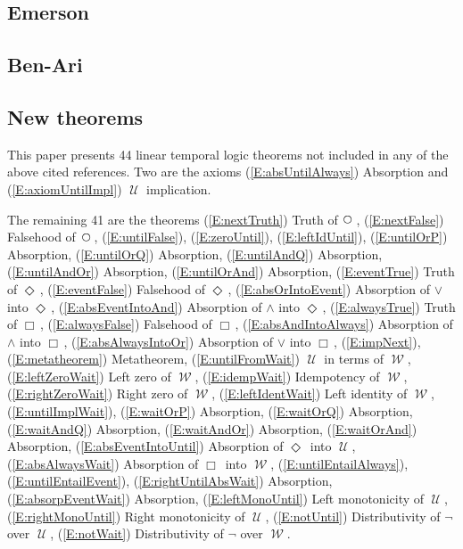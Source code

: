 \documentclass[12pt, fleqn, leqno]{article}
\newcommand{\Until}{\;\mathcal{U}\;}
\newcommand{\Wait}{\;\mathcal{W}\;}
\newcommand{\Next}{\;\,\text{\raisebox{3.5pt}{\circle{6}}}}
\newcommand{\Event}{\Diamond\,}
\newcommand{\Always}{\Box\,}
\begin{document}
\subsection{Emerson}

\subsection{Ben-Ari}

\subsection{New theorems}

This paper presents 44 linear temporal logic theorems not included in any of the above cited references.
Two are the axioms
(\ref{E:absUntilAlways}) Absorption and
(\ref{E:axiomUntilImpl}) $\Until$ implication.

The remaining 41 are the theorems
(\ref{E:nextTruth}) Truth of $\Next$,
(\ref{E:nextFalse}) Falsehood of $\Next$,
(\ref{E:untilFalse}),
(\ref{E:zeroUntil}),
(\ref{E:leftIdUntil}),
(\ref{E:untilOrP}) Absorption,
(\ref{E:untilOrQ}) Absorption,
(\ref{E:untilAndQ}) Absorption,
(\ref{E:untilAndOr}) Absorption,
(\ref{E:untilOrAnd}) Absorption,
(\ref{E:eventTrue}) Truth of $\Event$,
(\ref{E:eventFalse}) Falsehood of $\Event$,
(\ref{E:absOrIntoEvent}) Absorption of $\lor$ into $\Event$,
(\ref{E:absEventIntoAnd}) Absorption of $\land$ into $\Event$,
(\ref{E:alwaysTrue}) Truth of $\Always$,
(\ref{E:alwaysFalse}) Falsehood of $\Always$,
(\ref{E:absAndIntoAlways}) Absorption of $\land$ into $\Always$,
(\ref{E:absAlwaysIntoOr}) Absorption of $\lor$ into $\Always$,
(\ref{E:impNext}),
(\ref{E:metatheorem}) Metatheorem,
(\ref{E:untilFromWait}) $\Until$ in terms of $\Wait$,
(\ref{E:leftZeroWait}) Left zero of $\Wait$,
(\ref{E:idempWait}) Idempotency of $\Wait$,
(\ref{E:rightZeroWait}) Right zero of $\Wait$,
(\ref{E:leftIdentWait}) Left identity of $\Wait$,
(\ref{E:untilImplWait}),
(\ref{E:waitOrP}) Absorption,
(\ref{E:waitOrQ}) Absorption,
(\ref{E:waitAndQ}) Absorption,
(\ref{E:waitAndOr}) Absorption,
(\ref{E:waitOrAnd}) Absorption,
(\ref{E:absEventIntoUntil}) Absorption of $\Event$ into $\Until$,
(\ref{E:absAlwaysWait}) Absorption of $\Always$ into $\Wait$,
(\ref{E:untilEntailAlways}),
(\ref{E:untilEntailEvent}),
(\ref{E:rightUntilAbsWait}) Absorption,
(\ref{E:absorpEventWait}) Absorption,
(\ref{E:leftMonoUntil}) Left monotonicity of $\Until$,
(\ref{E:rightMonoUntil}) Right monotonicity of $\Until$,
(\ref{E:notUntil}) Distributivity of $\neg$ over $\Until$,
(\ref{E:notWait}) Distributivity of $\neg$ over $\Wait$.
\end{document}
